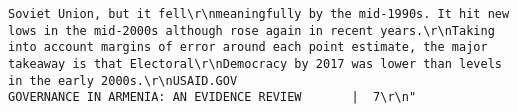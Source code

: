 \documentclass[
]{article}
\begin{document}
\begin{verbatim}
Soviet Union, but it fell\r\nmeaningfully by the mid-1990s. It hit new lows in the mid-2000s although rose again in recent years.\r\nTaking into account margins of error around each point estimate, the major takeaway is that Electoral\r\nDemocracy by 2017 was lower than levels in the early 2000s.\r\nUSAID.GOV                                                     GOVERNANCE IN ARMENIA: AN EVIDENCE REVIEW       |  7\r\n"                                                                                                                                                                                                                                                                                                                                                                                                                                                                                                                                                                                                                                                                                                                                                                                                                                                                                                                                                                                                                                                                                                                                                                                                                                                                                                                                                  

\end{verbatim}
\end{document}
